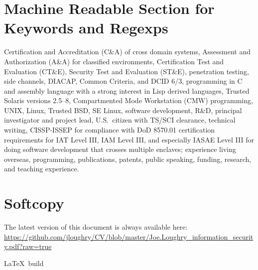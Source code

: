 \documentclass[12pt,twoside,letterpaper]{article}
\begin{document}
\section*{Machine Readable Section for Keywords and Regexps}
\vspace{-2mm}
Certification and Accreditation (C\&A) of cross domain systems,
Assessment and Authorization (A\&A) for classified environments,
Certification Test and Evaluation (CT\&E), Security Test and Evaluation (ST\&E),
penetration testing, side channels,
DIACAP, Common Criteria, and DCID 6/3,
programming in C and assembly language with a strong interest in Lisp derived languages,
Trusted Solaris versions 2.5--8, Compartmented Mode Workstation (CMW) programming,
UNIX, Linux, Trusted BSD, SE Linux,
software development,
R\&D,
principal investigator and project lead,
U.S.\ citizen with TS/SCI clearance,
technical writing,
CISSP-ISSEP for compliance with DoD 8570.01 certification requirements for IAT Level III,
	IAM Level III, and especially IASAE Level III for doing software development that crosses
	multiple enclaves;
experience living overseas,
programming,
publications,
patents,
public speaking,
funding,
research,
and teaching experience.

\vspace{-4mm}
\section*{Softcopy}
\vspace{-2mm}
The latest version of this document is always available here:
\url{https://github.com/jloughry/CV/blob/master/Joe.Loughry_information_security.pdf?raw=true}

\vfill
{\tiny \LaTeX\ build }
\end{document}
